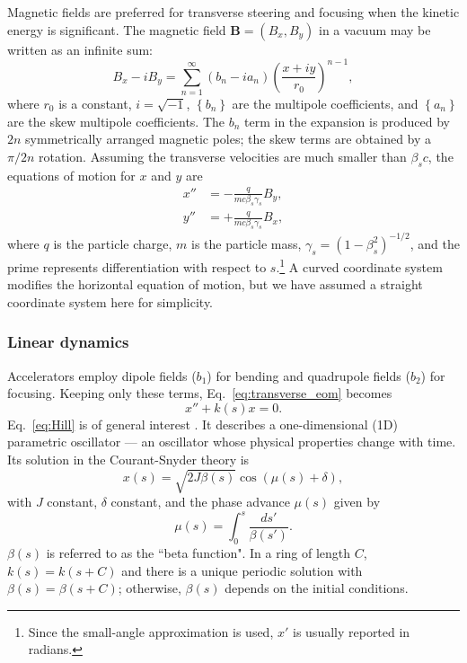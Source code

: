 Magnetic fields are preferred for transverse steering and focusing when the kinetic energy is significant. The magnetic field $\mathbf{B} = (B_x, B_y)$ in a vacuum may be written as an infinite sum:
%
\begin{equation}\label{eq:magnetic_field_expansion}
    B_x - iB_y = \sum_{n = 1}^{\infty}{(b_n - i a_n) \left({\frac{x + i y}{r_0}}\right)^{n - 1}},
\end{equation}
%
where $r_0$ is a constant, $i = \sqrt{-1}$, $\left\{ b_n \right\}$ are the multipole coefficients, and $\left\{ a_n \right\}$ are the skew multipole coefficients. The $b_n$ term in the expansion is produced by $2n$ symmetrically arranged magnetic poles; the skew terms are obtained by a $\pi / 2n$ rotation. Assuming the transverse velocities are much smaller than $\beta_s c$, the equations of motion for $x$ and $y$ are
%
\begin{equation}\label{eq:transverse_eom}
\begin{aligned}
    x'' &= -\frac{q}{m c \beta_s \gamma_s} B_y, \\
    y'' &= +\frac{q}{m c \beta_s \gamma_s} B_x,
\end{aligned}
\end{equation}
%
where $q$ is the particle charge, $m$ is the particle mass, $\gamma_s = (1 - \beta_s^2)^{-1/2}$, and the prime represents differentiation with respect to $s$.\footnote{Since the small-angle approximation is used, $x'$ is usually reported in radians.} A curved coordinate system modifies the horizontal equation of motion, but we have assumed a straight coordinate system here for simplicity.


\subsubsection{Linear dynamics}

 Accelerators employ dipole fields ($b_1$) for bending and quadrupole fields ($b_2$) for focusing. Keeping only these terms, Eq.~\eqref{eq:transverse_eom} becomes
%
 \begin{equation}\label{eq:Hill}
     x'' + k(s)x = 0.
 \end{equation}
%
Eq.~\eqref{eq:Hill} is of general interest \cite{Hill1886, Qin2007}. It describes a one-dimensional (1D) parametric oscillator — an oscillator whose physical properties change with time. Its solution in the Courant-Snyder theory \cite{Courant1958} is
%
\begin{equation}\label{eq:Hill_solution}
    x(s) = \sqrt{2 J \beta(s)} \cos{\left({\mu(s) + \delta}\right)},
\end{equation}
%
with $J$ constant, $\delta$ constant, and the phase advance $\mu(s)$ given by
%
\begin{equation}
    \mu(s) = \int_{0}^{s}{\frac{ds'}{\beta(s')}}.
\end{equation}
%
$\beta(s)$ is referred to as the ``beta function". In a ring of length $C$, $k(s) = k(s + C)$ and there is a unique periodic solution with $\beta(s) = \beta(s + C)$; otherwise, $\beta(s)$ depends on the initial conditions.

